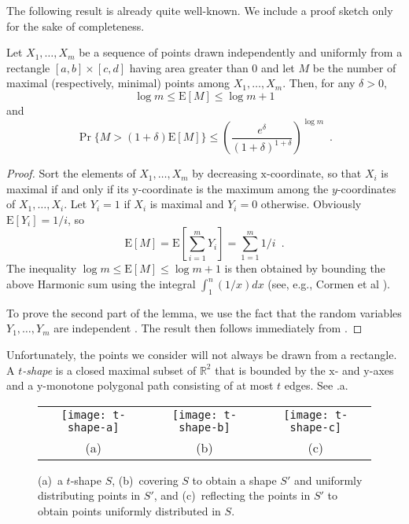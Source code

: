 \documentclass[lotsofwhite,charterfonts]{patmorin}
\newcommand{\RR}{\mathbb{R}}
\newcommand{\PROB}{\Pr}
\newcommand{\EXP}{\mathrm{E}}
\begin{document}
The following result is already quite well-known.  We include a
proof sketch only for the sake of completeness.

\begin{lem}
  Let $X_1,\ldots,X_m$ be a sequence of points drawn independently and
  uniformly from a rectangle $[a,b]\times[c,d]$ having area greater than
  0 and let $M$ be the number of maximal (respectively, minimal) points
  among $X_1,\ldots,X_m$.  Then, for any $\delta >0$,
  \begin{equation}
    \log m \le \EXP[M] \le \log m + 1
  \end{equation}
  and 
  \begin{equation}
    \PROB\{M>(1+\delta)\EXP[M]\} 
        \le \left(\frac{e^\delta}{(1+\delta)^{1+\delta}}\right)^{\log m}
		 \enspace .
  \end{equation}
\end{lem}

\begin{proof}
Sort the elements of $X_1,\ldots,X_m$ by decreasing
$\mathrm{x}$-coordinate, so that $X_i$ is maximal if and only if its
$\mathrm{y}$-coordinate is the maximum among the $y$-coordinates of
$X_1,\ldots,X_i$.  Let $Y_i=1$ if $X_i$ is maximal and $Y_i=0$ otherwise.
Obviously $\EXP[Y_i]=1/i$, so
\[
   \EXP[M] = \EXP\left[\sum_{i=1}^m Y_i\right] = \sum_{1=1}^m 1/i \enspace .
\]
The inequality $\log m \le \EXP[M]\le \log m + 1$ is then obtained by
bounding the above Harmonic sum using the integral $\int_{1}^{n}(1/x)dx$
(see, e.g., Cormen et al \cite[Appendix A.2]{clrs06}).

To prove the second part of the lemma, we use the fact that the random
variables $Y_1,\ldots,Y_m$ are independent \cite{d88,g78}.  The result
then follows immediately from .
\end{proof}

Unfortunately, the points we consider will not always be drawn from a
rectangle.  A \emph{$t$-shape} is a closed maximal subset of $\RR^2$ that
is bounded by the $\mathrm x$- and $\mathrm y$-axes and a $\mathrm
y$-monotone polygonal path consisting of at most $t$ edges.  See
.a.

\begin{figure}
  \begin{center}
    \begin{tabular}{ccc}
      \texttt{[image: t-shape-a]} & 
      \texttt{[image: t-shape-b]} & 
      \texttt{[image: t-shape-c]} \\
      (a) & (b) & (c)
    \end{tabular}
  \end{center}
  \caption{(a)~a $t$-shape $S$, (b)~covering $S$ to obtain a shape $S'$ and
uniformly distributing points in $S'$, and (c)~reflecting the points in
$S'$ to obtain points uniformly distributed in $S$.}
\end{figure}
\end{document}
